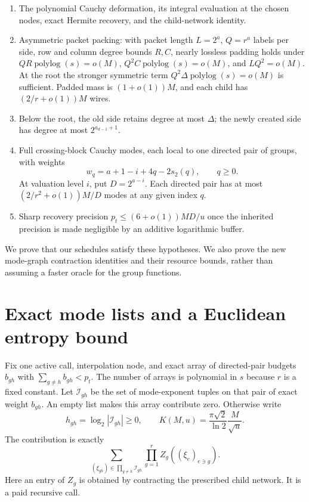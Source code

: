 \documentclass[11pt,letterpaper]{article}
\theoremstyle{remark}\newtheorem{remark}[theorem]{Remark}
\newcommand{\polylog}{\operatorname{polylog}}
\newcommand{\pc}{s_2}
\begin{document}
\begin{enumerate}
\item The polynomial Cauchy deformation, its integral evaluation at the
chosen nodes, exact Hermite recovery, and the child-network identity.
\item Asymmetric packet packing: with packet length $L=2^a$, $Q=r^a$
labels per side, row and column degree bounds $R,C$, nearly lossless
padding holds under $QR\polylog(s)=o(M)$,
$Q^2C\polylog(s)=o(M)$, and $LQ^2=o(M)$.
At the root the stronger symmetric term $Q^2\Delta\polylog(s)=o(M)$
is sufficient. Padded mass is $(1+o(1))M$, and each child has
$(2/r+o(1))M$ wires.
\item Below the root, the old side retains degree at most $\Delta$;
the newly created side has degree at most $2^{a_{d-1}+1}$.
\item Full crossing-block Cauchy modes, each local to one directed pair
of groups, with weights
\[
 w_q=a+1-i+4q-2\pc(q),\qquad q\ge0.
\]
At valuation level $i$, put $D=2^{a-i}$. Each directed pair has at most
$(2/r^2+o(1))M/D$ modes at any given index $q$.
\item Sharp recovery precision $p_t\le(6+o(1))MD/u$ once the inherited
precision is made negligible by an additive logarithmic buffer.
\end{enumerate}

We prove that our schedules satisfy these hypotheses. We also prove the new
mode-graph contraction identities and their resource bounds, rather than
assuming a faster oracle for the group functions.

\section{Exact mode lists and a Euclidean entropy bound}
\label{sec:entropy}

Fix one active call, interpolation node, and exact array of directed-pair
budgets $b_{gh}$ with $\sum_{g\ne h}b_{gh}<p_t$. The number of arrays is
polynomial in $s$ because $r$ is a fixed constant. Let $\mathcal I_{gh}$ be
the set of mode-exponent tuples on that pair of exact weight $b_{gh}$.
An empty list makes this array contribute zero. Otherwise write
\[
 h_{gh}=\log_2|\mathcal I_{gh}|\ge0,
 \qquad K(M,u)=\frac{\pi\sqrt2}{\ln2}\frac{M}{\sqrt u}.
\]
The contribution is exactly
\begin{equation}\label{eq:modegraph}
 \sum_{(\xi_{gh})\in\prod_{g\ne h}\mathcal I_{gh}}
 \prod_{g=1}^r Z_g((\xi_e)_{e\ni g}).
\end{equation}
Here an entry of $Z_g$ is obtained by contracting the prescribed child
network. It is a paid recursive call.
\end{document}
